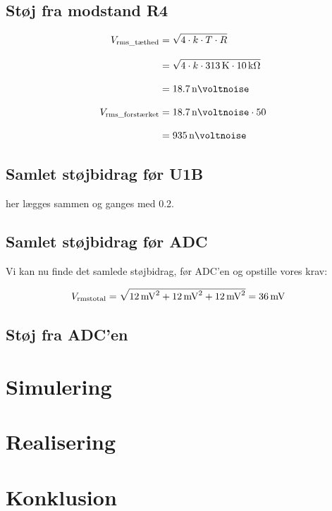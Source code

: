\documentclass[a4paper, 11pt, article,oneside,openany]{memoir} %
\newcommand{\tsub}[1]{_{\textup{#1}}}
\begin{document}
\subsection{Støj fra modstand R4}

\begin{align*}
V\tsub{rms\_tæthed} &= \sqrt{4 \cdot k \cdot T \cdot R}
\\[2.0ex]
&= \sqrt{4 \cdot k\cdot \SI{313}{\kelvin} \cdot \SI{10}{\kilo\ohm}}
\\[2.0ex]
&= \SI{18.7}{\nano\voltnoise}
\\[2.0ex]
V\tsub{rms\_forstærket} &= \SI{18.7}{\nano\voltnoise} \cdot 50
\\[2.0ex]
&= \SI{935}{\nano\voltnoise}
\end{align*}



\subsection{Samlet støjbidrag før U1B}

her lægges sammen og ganges med 0.2.



\subsection{Samlet støjbidrag før ADC}


Vi kan nu finde det samlede støjbidrag, før ADC'en og opstille vores krav:

\begin{align*}
V\tsub{rmstotal} &= \sqrt{\SI{12}{\milli\volt^2} + \SI{12}{\milli\volt^2} + \SI{12}{\milli\volt^2}} = \SI{36}{\milli\volt}
\end{align*}


\subsection{Støj fra ADC'en}





\section{Simulering}

\section{Realisering}

\section{Konklusion}
\end{document}
